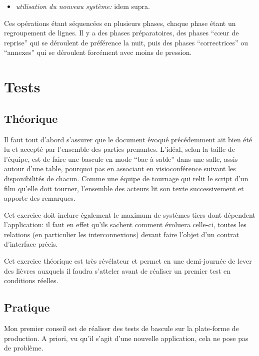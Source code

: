 \documentclass{book}
\begin{document}
\begin{itemize}
\begin{bclogo}[arrondi = 0.1, couleur = blue!10, logo = \bcinfo]{Dans le FPR2}
Ce serait d'ailleurs mon conseil: ne pas faire de reprise de données ``vivantes''. Il vaut mieux prendre une photographie des données, les reprendre, puis rendre les données reprises vivantes. Cela évite bien des problèmes mais nécessite une discipline et une rapidité dans l'exécution de la bascule.
 \end{bclogo}
 \item \textit{utilisation du nouveau système:} idem supra.
\end{itemize}

Ces opérations étant séquencées en plusieurs phases, chaque phase étant un regroupement de lignes. Il y a des phases préparatoires, des phases ``cœur de reprise'' qui se déroulent de préférence la nuit, puis des phases ``correctrices'' ou ``annexes'' qui se déroulent forcément avec moins de pression.
	
\section{Tests}
\subsection{Théorique}

Il faut tout d'abord s'assurer que le document évoqué précédemment ait bien été lu et accepté par l'ensemble des parties prenantes. L'idéal, selon la taille de l'équipe, est de faire une bascule en mode ``bac à sable'' dans une salle, assis autour d'une table, pourquoi pas en associant en visioconférence suivant les disponibilités de chacun. Comme une équipe de tournage qui relit le script d'un film qu'elle doit tourner, l'ensemble des acteurs lit son texte successivement et apporte des remarques.

Cet exercice doit inclure également le maximum de systèmes tiers dont dépendent l'application: il faut en effet qu'ils sachent comment évoluera celle-ci, toutes les relations (en particulier les interconnexions) devant faire l'objet d'un contrat d'interface précis.

Cet exercice théorique est très révélateur et permet en une demi-journée de lever des lièvres auxquels il faudra s'atteler avant de réaliser un premier test en conditions réelles.
	
\subsection{Pratique}

Mon premier conseil est de réaliser des tests de bascule sur la plate-forme de production. A priori, vu qu'il s'agit d'une nouvelle application, cela ne pose pas de problème.
\end{document}
